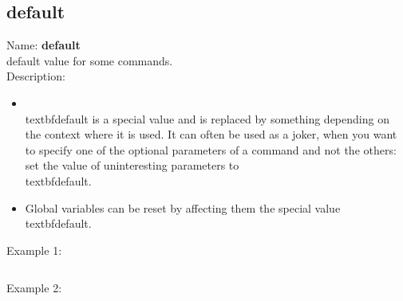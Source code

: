 \subsection{default}
\label{labdefault}
\noindent Name: \textbf{default}\\
default value for some commands.\\
\noindent Description: \begin{itemize}

\item \\textbf{default} is a special value and is replaced by something depending on the \n   context where it is used. It can often be used as a joker, when you want to \n   specify one of the optional parameters of a command and not the others: set \n   the value of uninteresting parameters to \\textbf{default}.\n
\item Global variables can be reset by affecting them the special value \\textbf{default}.\n\end{itemize}
\noindent Example 1: 
\begin{center}\begin{minipage}{15cm}\begin{Verbatim}[frame=single]
\end{Verbatim}
\end{minipage}\end{center}
\noindent Example 2: 
\begin{center}\begin{minipage}{15cm}\begin{Verbatim}[frame=single]
\end{Verbatim}
\end{minipage}\end{center}
